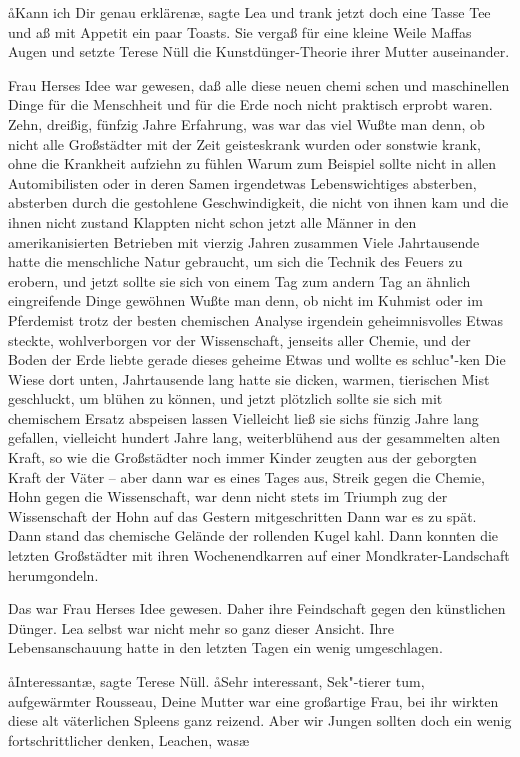 \aa Kann ich Dir genau erklären\ae, sagte Lea und trank jetzt doch
eine Tasse Tee und aß mit Appetit ein paar Toasts. Sie
vergaß für eine kleine Weile Maffas Augen und setzte Terese
Nüll die Kunstdünger-Theorie ihrer Mutter auseinander.

Frau Herses Idee war gewesen, daß alle diese neuen chemi\-%
schen und maschinellen Dinge für die Menschheit und für die
Erde noch nicht praktisch erprobt waren. Zehn, dreißig, fünfzig
Jahre Erfahrung, was war das viel\frag{} Wußte man denn, ob
nicht alle Großstädter mit der Zeit geisteskrank wurden oder
sonstwie krank, ohne die Krankheit aufziehn zu fühlen\frag{}
Warum zum Beispiel sollte nicht in allen Automibilisten oder
in deren Samen irgendetwas Lebenswichtiges absterben,
absterben durch die gestohlene Geschwindigkeit, die nicht von
ihnen kam und die ihnen nicht zustand\frag{} Klappten nicht schon
jetzt alle Männer in den amerikanisierten Betrieben mit
vierzig Jahren zusammen\frag{} Viele Jahrtausende hatte die
menschliche Natur gebraucht, um sich die Technik des Feuers
zu erobern, und jetzt sollte sie sich von einem Tag zum andern
Tag an ähnlich eingreifende Dinge gewöhnen\frag{} Wußte man
denn, ob nicht im Kuhmist oder im Pferdemist trotz der besten
chemischen Analyse irgendein geheimnisvolles Etwas steckte,
wohlverborgen vor der Wissenschaft, jenseits aller Chemie,
und der Boden der Erde liebte gerade dieses geheime Etwas
und wollte es schluc"-ken\frag{} Die Wiese dort unten, Jahrtausende
lang hatte sie dicken, warmen, tierischen Mist geschluckt, um
blühen zu können, und jetzt plötzlich sollte sie sich mit chemischem
Ersatz abspeisen lassen\frag{} Vielleicht ließ sie sichs fünzig Jahre
lang gefallen, vielleicht hundert Jahre lang, weiterblühend
aus der gesammelten alten Kraft, so wie die Großstädter noch
immer Kinder zeugten aus der geborgten Kraft der Väter --
aber dann war es eines Tages aus, Streik gegen die Chemie,
Hohn gegen die Wissenschaft, war denn nicht stets im Triumph\-%
zug der Wissenschaft der Hohn auf das Gestern mitgeschritten\frag{}
Dann war es zu spät. Dann stand das chemische Gelände der
rollenden Kugel kahl. Dann konnten die letzten Großstädter
mit ihren Wochenendkarren auf einer Mondkrater-Landschaft
herumgondeln.

Das war Frau Herses Idee gewesen. Daher ihre Feindschaft
gegen den künstlichen Dünger. Lea selbst war nicht mehr so
ganz dieser Ansicht. Ihre Lebensanschauung hatte in den
letzten Tagen ein wenig umgeschlagen.

\aa Interessant\ae, sagte Terese Nüll. \aa Sehr interessant, Sek"-tierer\-%
tum, aufgewärmter Rousseau, Deine
Mutter war eine großartige Frau, bei ihr wirkten diese alt\-%
väterlichen Spleens ganz reizend. Aber wir Jungen sollten
doch ein wenig fortschrittlicher denken, Leachen, was\frag\ae

